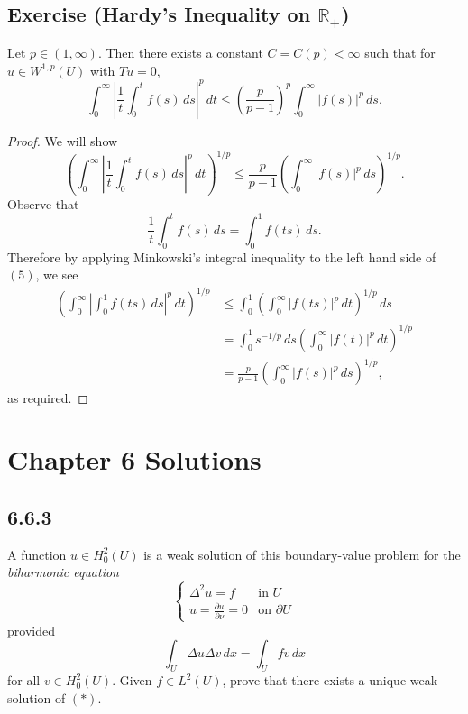 \documentclass{article}
\begin{document}
\begin{flushleft}
\subsection{\textbf{Exercise (Hardy's Inequality on $\mathbb R_+$)}} Let $p\in(1,\infty)$. Then there exists a constant $C=C(p) < \infty$ such that for $u\in W^{1,p}(U)$ with $Tu=0$,
$$\int_0^\infty \left| \frac1t \int_0^t f(s) \, ds\right|^p \, dt  \le \left(\frac p{p-1}\right)^p \int_0^\infty |f(s)|^p \, ds .$$

\begin{proof}
We will show 
\begin{equation}
\left(\int_0^\infty \left| \frac1t \int_0^t f(s) \, ds\right|^p \, dt \right)^{1/p} \le \frac p{p-1} \left(\int_0^\infty |f(s)|^p \, ds \right)^{1/p}.
\end{equation}
Observe that
$$ \frac1t \int_0^t f(s) \, ds = \int_0^1 f(t s) \, ds .$$
Therefore by applying Minkowski's integral inequality to the left hand side of $(5)$, we see
\begin{align*}
\left(\int_0^\infty \left| \int_0^1 f(t s) \, ds\right|^p \,dt\right)^{1/p} &
\le \int_0^1\left(\int_0^\infty \left|f(ts)\right|^p\,dt\right)^{1/p}\,ds \\&=
\int_0^1 s^{-1/p}\,ds\left(\int_0^\infty \left|f(t)\right|^p\,dt\right)^{1/p}
\\&=
\frac{p}{p-1}\left(\int_0^\infty \left|f(s)\right|^p\,ds\right)^{1/p},
\end{align*}
as required.

\end{proof}

\section{Chapter 6 Solutions}

\subsection{\textbf{6.6.3}} A function $u\in H_0^2(U)$ is a weak solution of this boundary-value problem for the \textit{biharmonic equation}
\[
  \begin{cases} 
      \Delta^2 u=f & \text{in $U$} \\
      u=\frac{\partial u}{\partial \nu}=0 & \text{on $\partial U$} 
   \end{cases}
   \tag{\ast} \label{eq:special}
\]
provided
$$\int_U\Delta u\Delta v \,dx = \int_U fv\,dx$$
for all $v\in H_0^2(U)$. Given $f\in L^2(U)$, prove that there exists a unique weak solution of $(\ast)$.


\end{flushleft}
\end{document}
